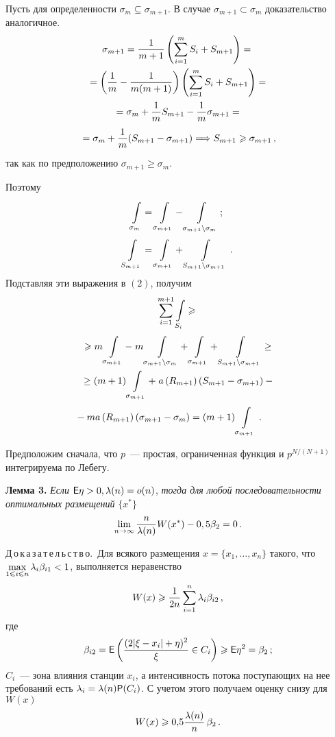 \begin{multicols}{2}
Пусть для определенности $\sigma_m \subseteq \sigma_{m+1}$.
В случае $\sigma_{m+1} \subset
\sigma_m$ доказательство аналогичное.
\begin{multline*}
\sigma_{m+1}=\displaystyle\frac{\displaystyle 1\mathstrut}{\displaystyle m+1\mathstrut} \left( \sum\limits_{i=1}^{m}S_i + S_{m+1} \right) ={}\\
{}= \left(
\displaystyle\frac{\displaystyle 1\mathstrut}{\displaystyle m\mathstrut}-\displaystyle\frac{\displaystyle 1\mathstrut}{\displaystyle m(m+1)\mathstrut} \right) \left( \sum\limits_{i=1}^{m}S_i + S_{m+1} \right)={}\\
{}=\sigma_m+\displaystyle\frac{\displaystyle 1\mathstrut}{\displaystyle m\mathstrut}S_{m+1}-\displaystyle\frac{\displaystyle 1\mathstrut}{\displaystyle m\mathstrut}\sigma_{m+1}={}\\
{}=
\sigma_m+\displaystyle\frac{\displaystyle 1\mathstrut}{\displaystyle m\mathstrut}(S_{m+1}-\sigma_{m+1})
\Longrightarrow
S_{m+1} \geqslant \sigma_{m+1}\,,
\end{multline*}
так как по предположению $\sigma_{m+1}\geqslant \sigma_m$.

Поэтому
\begin{align*}
\int\limits_{\sigma_m}^{}&=\int\limits_{\sigma_{m+1}}^{}-\int\limits_{\sigma_{m+1}\backslash \sigma_m}^{}\,; \\
\int\limits_{S_{m+1}}^{}&=\int\limits_{\sigma_{m+1}}^{}+\int\limits_{S_{m+1}\backslash \sigma_{m+1}}^{}\,.
\end{align*}
Подставляя эти выражения в $(2)$, получим
\begin{multline*}
\suml{i=1}{m+1}\il{S_i}{}  \geqslant{}\\
{}\geqslant  m \int\limits_{\sigma_{m+1}} -\; m \il{\sigma_{m+1}\backslash
\sigma_m}{} +  \il{\sigma_{m+1}}{}  + \il{S_{m+1}\backslash \sigma_{m+1}}{} \geq{}
\\
{}\geq
 (m+1) \int\limits_{\sigma_{m+1}}  +\;  a\left ( R_{m+1}\right )(S_{m+1}- \sigma_{m+1})  - {}\\
 {}- m a\left ( R_{m+1}\right )(\sigma_{m+1} - \sigma_m) =
 (m+1) \il{\sigma_{m+1}}{} \,. \qquad  %
\end{multline*}

Предположим сначала, что $p$~--- простая, ограниченная функция и $p^{N/(N+1)}$
интегрируема по Лебегу.

\smallskip

\noindent
\textbf{Лемма 3.} {\it Если} ${{\sf E}} \eta > 0, \lambda(n)=o(n)$, {\it тогда для любой
последовательности оптимальных размещений} $\{x^*\}$
$$
\lim\limits_{n\rightarrow\infty}\frac{n}{\lambda(n)}W(x^*)-0,5\beta_2=0\,.
$$

Д\,о\,к\,а\,з\,а\,т\,е\,л\,ь\,с\,т\,в\,о.~Для всякого размещения $x=\{x_1,\ldots,x_n\}$ такого, что
$\max\limits_{1\leqslant i\leqslant n} \lambda_i \beta_{i1}< 1 $, выполняется неравенство
$$ %
W(x)\geqslant \fr{1}{2n}\suml{i=1}{n}\lambda_i \beta_{i2}\,,
$$
где
$$
\beta_{i2}=
{{\sf E}}\left ( \displaystyle\frac{\displaystyle  (2|\xi-x_i|+\eta)^2\mathstrut}{\displaystyle \xi\mathstrut}\in C_i\right )\geqslant {\sf E}\eta^2=\beta_2\,;
$$
$C_i$~--- зона влияния станции $x_i$, а интенсивность потока поступающих на нее
требований есть $\lambda_i=\lambda(n) {{\sf P}} (C_i)$. С учетом этого получаем оценку снизу
для $W(x)$
$$
W(x)\geqslant 0{,}5\displaystyle\frac{\displaystyle \lambda(n)\mathstrut}{\displaystyle n\mathstrut}\,\beta_2\,.
$$


\end{multicols}
